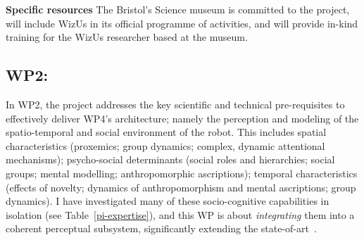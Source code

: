 \documentclass[11pt,a4paper]{report}
\newcommand{\project}{WizUs\xspace}
\begin{document}
\textbf{Specific resources} The Bristol's Science museum is committed to the
project, will include \project in its official programme of activities, and will
provide in-kind training for the \project researcher based at the museum.

% 
% 
% 
% 
% 
% 
% 
% 
% 



\subsection{WP2: \textbf{\wpTwo}}


In WP2, the project addresses the key scientific and technical pre-requisites to
effectively deliver WP4's architecture; namely the perception and modeling of
the spatio-temporal and social environment of the robot. This includes spatial
characteristics (proxemics; group dynamics; complex, dynamic attentional
mechanisms); psycho-social determinants (social roles and hierarchies; social
groups; mental modelling; anthropomorphic ascriptions); temporal characteristics
(effects of novelty; dynamics of anthropomorphism and mental ascriptions; group
dynamics). I have investigated many of these socio-cognitive capabilities in
isolation (see Table~\ref{pi-expertise}), and this WP is about
\emph{integrating} them into a coherent perceptual subsystem, significantly
extending the state-of-art~\cite{lemaignan2017artificial, baxter2016cognitive}.
\end{document}
